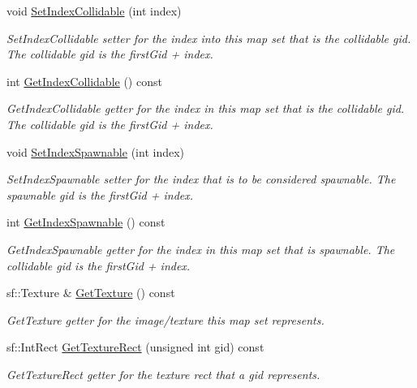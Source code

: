 \begin{DoxyCompactItemize}
void \hyperlink{class_tile_map_set_a9c14b329f61709654953c7978065778a}{Set\-Index\-Collidable} (int index)
\begin{DoxyCompactList}\small\item\em Set\-Index\-Collidable setter for the index into this map set that is the collidable gid. The collidable gid is the first\-Gid + index. \end{DoxyCompactList}\item 
int \hyperlink{class_tile_map_set_ad3aa4aadee0b9686dc7a03beb7604203}{Get\-Index\-Collidable} () const 
\begin{DoxyCompactList}\small\item\em Get\-Index\-Collidable getter for the index in this map set that is the collidable gid. The collidable gid is the first\-Gid + index. \end{DoxyCompactList}\item 
void \hyperlink{class_tile_map_set_a477cc5c81ce119e7611270448dbe73fa}{Set\-Index\-Spawnable} (int index)
\begin{DoxyCompactList}\small\item\em Set\-Index\-Spawnable setter for the index that is to be considered spawnable. The spawnable gid is the first\-Gid + index. \end{DoxyCompactList}\item 
int \hyperlink{class_tile_map_set_aaedc48df137fa504bf4911e6cf31e63a}{Get\-Index\-Spawnable} () const 
\begin{DoxyCompactList}\small\item\em Get\-Index\-Spawnable getter for the index in this map set that is spawnable. The collidable gid is the first\-Gid + index. \end{DoxyCompactList}\item 
sf\-::\-Texture \& \hyperlink{class_tile_map_set_a903f3babc3298ec0d91208cb1a0a476a}{Get\-Texture} () const 
\begin{DoxyCompactList}\small\item\em Get\-Texture getter for the image/texture this map set represents. \end{DoxyCompactList}\item 
sf\-::\-Int\-Rect \hyperlink{class_tile_map_set_a3ffb31b962f96260211537f5c8256db3}{Get\-Texture\-Rect} (unsigned int gid) const 
\begin{DoxyCompactList}\small\item\em Get\-Texture\-Rect getter for the texture rect that a gid represents. \end{DoxyCompactList}\end{DoxyCompactItemize}
